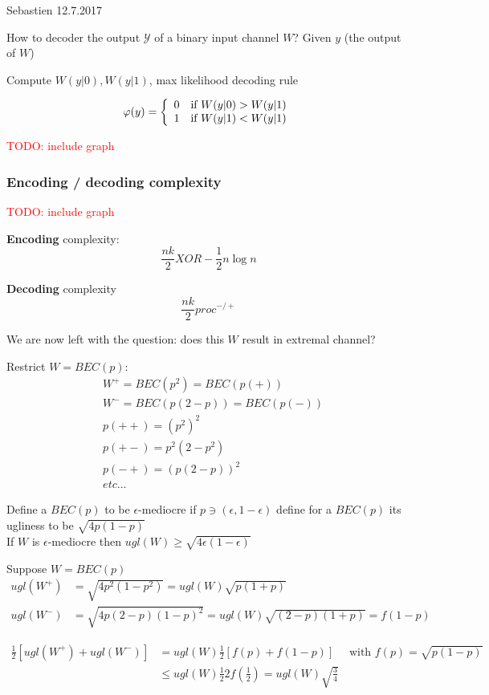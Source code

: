 \documentclass[twoside]{article}
\theoremstyle{definition} %
\newcommand{\todo}[1]{\textcolor{red}{TODO: #1}}
\def\Y{\mathcal{Y}}
\begin{document}
  Sebastien 12.7.2017

How to decoder the output $\Y$ of a binary input channel $W$? Given $y$ (the output of $W$)

Compute $W(y|0), W(y|1)$, max likelihood decoding rule

\[
\varphi(y) =
\left\{
\begin{array}{c c}
  0 & \text{if } W(y|0) > W(y|1) \\
  1 & \text{if } W(y|1) < W(y|1) \\
\end{array}
\right.
\]

\todo{include graph}

\subsubsection*{Encoding / decoding complexity}

\todo{include graph}

\textbf{Encoding} complexity:
\[
  \frac{nk}{2} XOR - \frac{1}{2} n \log n
\]

\textbf{Decoding} complexity
\[
  \frac{nk}{2} proc^{-/+}
\]

We are now left with the question: does this $W$ result in extremal channel?

Restrict $W = BEC(p)$:
\begin{align*}
  & W^+ = BEC(p^2) = BEC(p(+)) \\
  & W^- = BEC(p(2-p)) = BEC(p(-)) \\
  & p(++) = (p^2)^2 \\
  & p(+-) = p^2 (2 - p^2) \\
  & p(-+) = (p(2-p))^2 \\
  & etc...
\end{align*}

Define a $BEC(p)$ to be $\epsilon$-mediocre if $p \ni (\epsilon, 1-\epsilon)$ define for a $BEC(p)$ its ugliness to be $\sqrt{4 p(1-p)}$ \\
If $W$ is $\epsilon$-mediocre then $ugl(W) \geq \sqrt{4 \epsilon ( 1 - \epsilon)}$

Suppose $W = BEC(p)$
\begin{align*}
  ugl(W^+) &= \sqrt{4 p^2 (1-p^2)}    = ugl(W) \sqrt{p (1+p)} \\
  ugl(W^-) &= \sqrt{4 p (2-p)(1-p)^2} = ugl(W) \sqrt{(2-p)(1+p)} = f(1-p)
\end{align*}

\begin{align*}
  \frac{1}{2} [ugl(W^+) + ugl(W^-)] &= ugl(W) \frac{1}{2} [f(p) + f(1-p)] \quad \text{ with } f(p) = \sqrt{p(1-p)} \\
    &\leq ugl(W) \frac{1}{2} 2 f(\frac{1}{2}) = ugl(W) \sqrt{\frac{3}{4}}
\end{align*}
\end{document}
